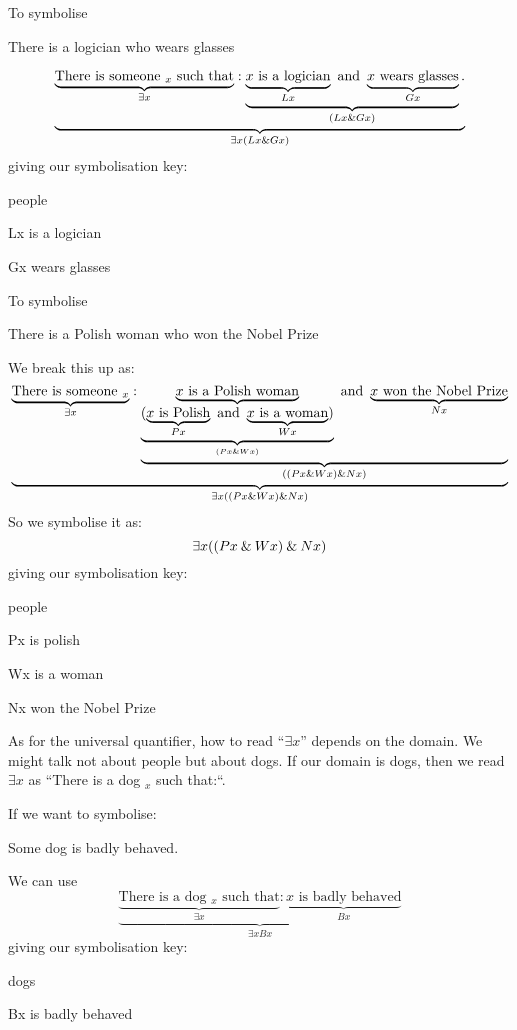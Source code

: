 To symbolise
\begin{earg}
\item[\ex{q.e}] There is a logician who wears glasses
\end{earg}
$$\underbrace{\underbrace{\text{There is someone $_x$ such that}}_{\exists x}: \underbrace{\underbrace{\text{$x$ is a logician}}_{Lx}\text{ and }\underbrace{\text{$x$ wears glasses}}_{Gx}}_{(Lx\mathbin{\&} Gx)}.}_{\exists x(Lx\mathbin{\&} Gx)}$$
giving our symbolisation key:
\begin{ekey}
\item[\text{domain}] people
\item[Lx] is a logician
\item[Gx] wears glasses
\end{ekey}

To symbolise
\begin{earg}
\item[\ex{q.e}] There is a Polish woman who won the Nobel Prize
\end{earg}
We break this up as:
$$
\underbrace{
	\underbrace{\text{There is someone $_x$}}_{\exists x}:
	\underbrace{
		\underbrace{\text{$x$ is a Polish woman}}_{
			\underbrace{(\underbrace{\text{$x$ is Polish}}_{Px}
			\text{ and }
			\underbrace{\text{$x$ is a woman}}_{Wx}
			)}_{(Px\mathbin{\&} Wx)}
			}
		\text{ and }
		\underbrace{\text{$x$ won the Nobel Prize}}_{Nx}
	}_{((Px\mathbin{\&} Wx)\mathbin{\&} Nx)}
}_{\exists x((Px\mathbin{\&} Wx)\mathbin{\&} Nx)}
$$
So we symbolise it as:
$$\exists x((Px\mathbin{\&} Wx)\mathbin{\&} Nx)$$
giving our symbolisation key:
\begin{ekey}
\item[\text{domain}] people
\item[Px] is polish
\item[Wx] is a woman
\item[Nx] won the Nobel Prize
\end{ekey}


As for the universal quantifier, how to read ``$\exists x$'' depends on the domain. We might talk not about people but about dogs. If our domain is dogs, then we read $\exists x$ as ``There is a dog $_x$ such that:``.

If we want to symbolise:
\begin{earg}
\item[\ex{q.dog}] Some dog is badly behaved.
\end{earg}
We can use
$$\underbrace{\underbrace{\text{There is a dog $_x$ such that}}_{\exists x}: \underbrace{\text{$x$ is badly behaved}}_{Bx}}_{\exists xBx}$$
giving our symbolisation key:
\begin{ekey}
\item[\text{domain}] dogs
\item[Bx] is badly behaved
\end{ekey}

